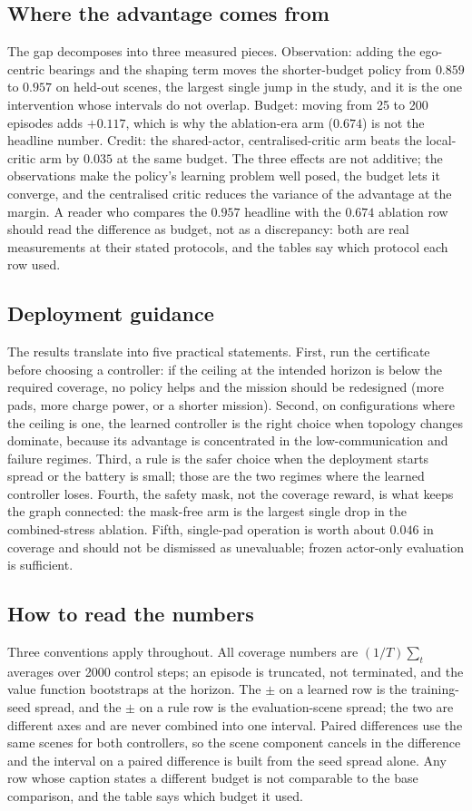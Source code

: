 \documentclass[conference]{IEEEtran}
\begin{document}
\subsection{Where the advantage comes from}
The gap decomposes into three measured pieces. Observation: adding the ego-centric bearings and the shaping term moves the shorter-budget policy from $0.859$ to $0.957$ on held-out scenes, the largest single jump in the study, and it is the one intervention whose intervals do not overlap. Budget: moving from 25 to 200 episodes adds $+0.117$, which is why the ablation-era arm ($0.674$) is not the headline number. Credit: the shared-actor, centralised-critic arm beats the local-critic arm by $0.035$ at the same budget. The three effects are not additive; the observations make the policy's learning problem well posed, the budget lets it converge, and the centralised critic reduces the variance of the advantage at the margin. A reader who compares the $0.957$ headline with the $0.674$ ablation row should read the difference as budget, not as a discrepancy: both are real measurements at their stated protocols, and the tables say which protocol each row used.

\subsection{Deployment guidance}
The results translate into five practical statements. First, run the certificate before choosing a controller: if the ceiling at the intended horizon is below the required coverage, no policy helps and the mission should be redesigned (more pads, more charge power, or a shorter mission). Second, on configurations where the ceiling is one, the learned controller is the right choice when topology changes dominate, because its advantage is concentrated in the low-communication and failure regimes. Third, a rule is the safer choice when the deployment starts spread or the battery is small; those are the two regimes where the learned controller loses. Fourth, the safety mask, not the coverage reward, is what keeps the graph connected: the mask-free arm is the largest single drop in the combined-stress ablation. Fifth, single-pad operation is worth about $0.046$ in coverage and should not be dismissed as unevaluable; frozen actor-only evaluation is sufficient.

\subsection{How to read the numbers}
Three conventions apply throughout. All coverage numbers are $(1/T)\sum_t$ averages over 2000 control steps; an episode is truncated, not terminated, and the value function bootstraps at the horizon. The $\pm$ on a learned row is the training-seed spread, and the $\pm$ on a rule row is the evaluation-scene spread; the two are different axes and are never combined into one interval. Paired differences use the same scenes for both controllers, so the scene component cancels in the difference and the interval on a paired difference is built from the seed spread alone. Any row whose caption states a different budget is not comparable to the base comparison, and the table says which budget it used.
\end{document}
